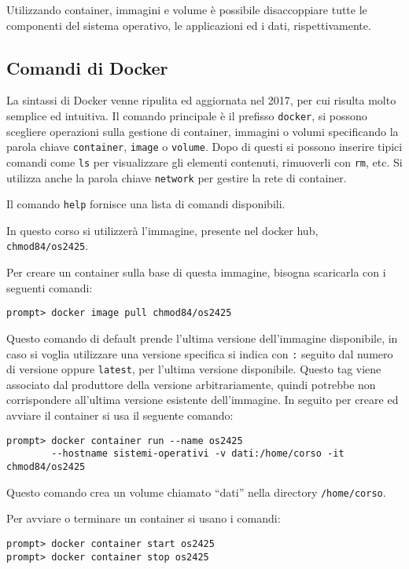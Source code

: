\documentclass{article}
\numberwithin{equation}{subsection}
\begin{document}
Utilizzando container, immagini e volume è possibile disaccoppiare tutte le componenti del sistema operativo, le applicazioni ed i dati, rispettivamente. 

\subsection{Comandi di Docker}

La sintassi di Docker venne ripulita ed aggiornata nel 2017, per cui risulta molto semplice ed intuitiva. Il comando principale è il prefisso \verb|docker|, si possono scegliere operazioni sulla gestione di container, 
immagini o volumi specificando la parola chiave \verb|container|, \verb|image| o \verb|volume|. Dopo di questi si possono inserire tipici comandi come \verb|ls| per visualizzare gli elementi contenuti, rimuoverli con 
\verb|rm|, etc. Si utilizza anche la parola chiave \verb|network| per gestire la rete di container. 

Il comando \verb|help| fornisce una lista di comandi disponibili. 

In questo corso si utilizzerà l'immagine, presente nel docker hub, \verb|chmod84/os2425|. 


Per creare un container sulla base di questa immagine, bisogna scaricarla con i seguenti comandi:
\begin{verbatim}
prompt> docker image pull chmod84/os2425
\end{verbatim}
Questo comando di default prende l'ultima versione dell'immagine disponibile, in caso si voglia utilizzare una versione specifica si indica con \verb|:| seguito dal numero di versione oppure \verb|latest|, per l'ultima 
versione disponibile. Questo tag viene associato dal produttore della versione arbitrariamente, quindi potrebbe non corrispondere all'ultima versione esistente dell'immagine. 
In seguito per creare ed avviare il container si usa il seguente comando:
\begin{verbatim}
prompt> docker container run --name os2425 
        --hostname sistemi-operativi -v dati:/home/corso -it chmod84/os2425
\end{verbatim}
Questo comando crea un volume chiamato ``dati'' nella directory \verb|/home/corso|. 

Per avviare o terminare un container si usano i comandi:
\begin{verbatim}
prompt> docker container start os2425
prompt> docker container stop os2425
\end{verbatim}
\end{document}
